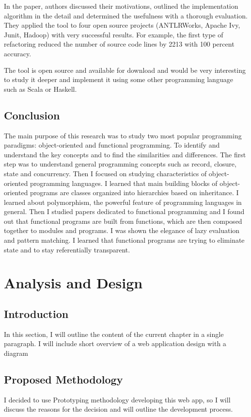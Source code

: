 \documentclass[12pt,twoside,a4paper]{report}
\begin{document}
In the paper, authors discussed their motivations, outlined the implementation algorithm in the detail and determined the usefulness with a thorough evaluation. They applied the tool to four open source projects (ANTLRWorks, Apache Ivy, Junit, Hadoop) with very successful results. For example, the first type of
refactoring reduced the number of source code lines by 2213 with 100 percent accuracy.

The tool is open source and available for download and would be very interesting to study it deeper and implement it using some other programming language such as Scala or Haskell.

\section{Conclusion}
The main purpose of this research was to study two most popular programming paradigms: object-oriented and functional programming. To identify and understand the key concepts and to
find the similarities and differences. The first step was to understand general programming concepts such as record, closure, state and concurrency. Then I focused on studying characteristics of object-oriented programming languages. I learned that main building blocks of object-oriented programs are classes organized into hierarchies based on inheritance. I learned about polymorphism, the powerful feature of programming languages in general. Then I studied papers dedicated to functional programming and I found out that functional programs are built from functions, which are then composed together to modules and programs. I was shown the elegance of lazy evaluation and pattern matching. I learned that functional programs are trying to eliminate state and to stay referentially transparent.

\chapter{Analysis and Design}
\section{Introduction}
In this section, I will outline the content of the current chapter in a single paragraph. I will include short overview of a web application design with a diagram

\section{Proposed Methodology}
I decided to use Prototyping methodology developing this web app, so I will discuss the reasons for the decision and will outline the development process.
\end{document}
